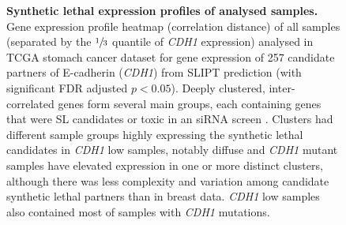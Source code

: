 \begin{figure}[!ht]
\begin{mdframed}
  \centering
    \caption[Synthetic lethal expression profiles of stomach samples]{\small \textbf{Synthetic lethal expression profiles of analysed samples.} Gene expression profile heatmap (correlation distance) of all samples (separated by the $\sfrac{1}{3}$ quantile of \textit{CDH1} expression) analysed in TCGA stomach cancer dataset for gene expression of 257 candidate partners of E-cadherin (\textit{CDH1}) from SLIPT prediction (with significant FDR adjusted $p < 0.05$). Deeply clustered, inter-correlated genes form several main groups, each containing genes that were SL candidates or toxic in an siRNA screen \citep{Telford2015}. Clusters had different sample groups highly expressing the synthetic lethal candidates in \textit{CDH1} low samples, notably diffuse and \textit{CDH1} mutant samples have elevated expression in one or more distinct clusters, although there was less complexity and variation among candidate synthetic lethal partners than in breast data. \textit{CDH1} low samples also contained most of samples with \textit{CDH1} mutations.
}
\label{fig:slipt_expr_stad_mtSL}
\end{mdframed}
\end{figure}

